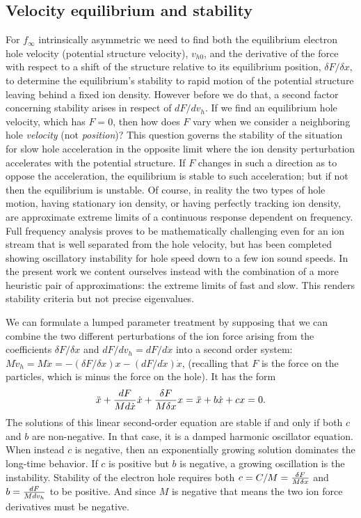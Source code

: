 \documentclass[pre]{revtex4-2}
\begin{document}
\subsection{Velocity equilibrium and stability}
\label{3.2}

For $f_\infty$ intrinsically asymmetric we need to find both the
equilibrium electron hole velocity (potential structure velocity),
$v_{h0}$, and the derivative of the force with respect to a shift of
the structure relative to its equilibrium position,
$\delta F/\delta x$, to determine the equilibrium's stability to rapid
motion of the potential structure leaving behind a fixed ion
density. However before we do that, a second factor concerning
stability arises in respect of $dF/dv_h$. If we find an equilibrium
hole velocity, which has $F=0$, then how does $F$ vary when we
consider a neighboring hole \emph{velocity} (not \emph{position})?
This question governs the stability of the situation for slow hole
acceleration in the opposite limit where the ion density perturbation
accelerates with the potential structure. If $F$ changes in such a
direction as to oppose the acceleration, the equilibrium is stable to
such acceleration; but if not then the equilibrium is unstable. Of
course, in reality the two types of hole motion, having stationary ion
density, or having perfectly tracking ion density, are approximate
extreme limits of a continuous response dependent on frequency. Full
frequency analysis proves to be mathematically challenging even for an
ion stream that is well separated from the hole velocity, but has been
completed showing oscillatory instability for hole speed down to a few
ion sound speeds\cite{Zhou2017}.  In the present work we content
ourselves instead with the combination of a more heuristic pair of
approximations: the extreme limits of fast and slow. This renders
stability criteria but not precise eigenvalues.


We can formulate a lumped parameter treatment by supposing that we can
combine the two different perturbations of the ion force arising from
the coefficients $\delta F/\delta x$ and $dF/dv_h=dF/d\dot x$ into a
second order system:
$M\dot v_h= M\ddot x = -(\delta F/\delta x) x - (dF/d\dot x) \dot x$,
(recalling that $F$ is the force on the particles, which is minus the
force on the hole). It has the form
\begin{equation}
  \label{eq:harmosc}
  \ddot x +{dF\over Md\dot x}\dot x+{\delta F\over M\delta x} x= \ddot x+
   b\dot x + c x=0.
\end{equation}
The solutions of this linear second-order equation are stable if and
only if both $c$ and $b$ are non-negative. In that case, it is a damped
harmonic oscillator equation. When instead $c$ is negative, then an
exponentially growing solution dominates the long-time behavior. If
$c$ is positive but $b$ is negative, a growing oscillation is the
instability. Stability of the electron hole requires both $c=C/M={\delta
  F\over M\delta x}$ and $b={dF\over Md v_h}$ to be positive. And
since $M$ is negative that means the two ion force derivatives must be
negative. 
\end{document}
